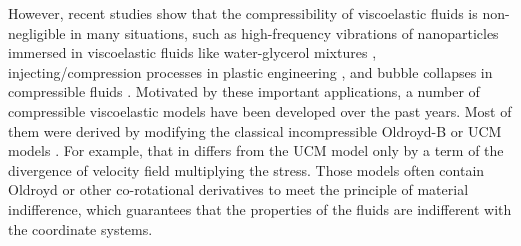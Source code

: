 \documentclass{article}
\theoremstyle{plain}
\begin{document}

However, recent studies show that the compressibility of viscoelastic fluids is non-negligible in many situations, such as high-frequency vibrations of nanoparticles immersed in viscoelastic fluids like water-glycerol mixtures \cite{yu2015compressible,galstyan2015note,chakraborty2015constitutive,pelton2009damping}, injecting/compression processes in plastic engineering \cite{kim1999numerical},
and bubble collapses in compressible fluids \cite{lind2013bubble}.
Motivated  by these important applications, a number of compressible viscoelastic models have been developed over the past years. Most of them were derived by modifying the classical incompressible Oldroyd-B or UCM models \cite{beris2013thermodynamics,ottinger2005beyond,edwards1990remarks,belblidia2006stabilised,bollada2012mathematical,chakraborty2015constitutive,sureshkumar2004stability}. For example, that in \cite{edwards1990remarks} differs from the UCM model only by a term of the divergence of velocity field multiplying the stress. Those models often contain Oldroyd or other co-rotational derivatives to meet the principle of material indifference, which guarantees that the properties of the fluids are indifferent with the coordinate systems.
\end{document}
